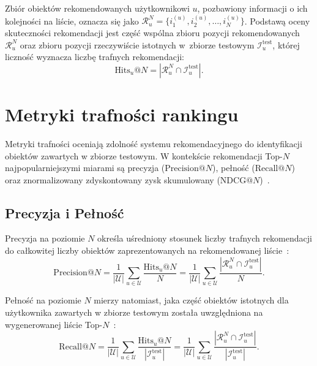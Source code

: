 Zbiór obiektów rekomendowanych użytkownikowi $u$, pozbawiony informacji o ich kolejności na liście, oznacza się jako $\mathcal{R}_u^N = \{ i_1^{(u)}, i_2^{(u)}, \dots, i_N^{(u)} \}$. Podstawą oceny skuteczności rekomendacji jest część wspólna zbioru pozycji
rekomendowanych $\mathcal{R}_u^N$ oraz zbioru pozycji rzeczywiście istotnych
w~zbiorze testowym $\mathcal{I}_u^{\text{test}}$, której liczność wyznacza
liczbę trafnych rekomendacji:
\begin{equation}
    \text{Hits}_u@N = \left| \mathcal{R}_u^N \cap \mathcal{I}_u^{\text{test}} \right|.
\end{equation}

\section{Metryki trafności rankingu}

Metryki trafności oceniają zdolność systemu rekomendacyjnego do identyfikacji obiektów zawartych w zbiorze testowym. W kontekście rekomendacji Top-$N$ najpopularniejszymi miarami są precyzja ($\text{Precision}@N$), pełność ($\text{Recall}@N$) oraz znormalizowany zdyskontowany zysk skumulowany ($\text{NDCG}@N$)~\cite{jannach2011recommender, aggarwal2016recommender}.

\subsection{Precyzja i Pełność}
\label{subsec:precyzja-pelnosc}

Precyzja na poziomie $N$ określa uśredniony stosunek liczby trafnych rekomendacji do całkowitej liczby obiektów zaprezentowanych na rekomendowanej liście~\cite{jannach2011recommender}:
\begin{equation}
    \text{Precision}@N = \frac{1}{|\mathcal{U}|} \sum_{u \in \mathcal{U}} \frac{\text{Hits}_u@N}{N} = \frac{1}{|\mathcal{U}|} \sum_{u \in \mathcal{U}} \frac{\left| \mathcal{R}_u^N \cap \mathcal{I}_u^{\text{test}} \right|}{N}.
\end{equation}

Pełność na poziomie $N$ mierzy natomiast, jaka część obiektów istotnych dla użytkownika zawartych w zbiorze testowym została uwzględniona na wygenerowanej liście Top-$N$~\cite{jannach2011recommender}:
\begin{equation}
    \text{Recall}@N = \frac{1}{|\mathcal{U}|} \sum_{u \in \mathcal{U}} \frac{\text{Hits}_u@N}{\left| \mathcal{I}_u^{\text{test}} \right|} = \frac{1}{|\mathcal{U}|} \sum_{u \in \mathcal{U}} \frac{\left| \mathcal{R}_u^N \cap \mathcal{I}_u^{\text{test}} \right|}{\left| \mathcal{I}_u^{\text{test}} \right|}.
\end{equation}

